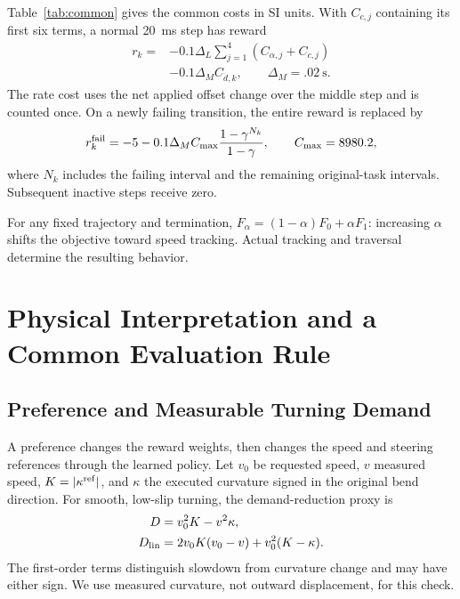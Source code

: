 \documentclass[journal]{IEEEtran}
\begin{document}
Table~\ref{tab:common} gives the common costs in SI units. With $C_{c,j}$ containing its first six terms, a normal 20~ms step has reward
\begin{equation}
\begin{split}
 r_k={}&-0.1\Delta_L\sum_{j=1}^4(C_{\alpha,j}+C_{c,j})\\
     &-0.1\Delta_M C_{\dot d,k},\qquad\Delta_M=.02~\mathrm s.
\end{split}
 \label{eq:reward}
\end{equation}
The rate cost uses the net applied offset change over the middle step and is counted once. On a newly failing transition, the entire reward is replaced by
\begin{equation}
 r_k^{\rm fail}=-5-0.1\Delta_M C_{\max}
 \frac{1-\gamma^{N_k}}{1-\gamma},\qquad C_{\max}=8980.2,
 \label{eq:terminal}
\end{equation}
where $N_k$ includes the failing interval and the remaining original-task intervals. Subsequent inactive steps receive zero.

For any fixed trajectory and termination, $F_\alpha=(1-\alpha)F_0+\alpha F_1$: increasing $\alpha$ shifts the objective toward speed tracking. Actual tracking and traversal determine the resulting behavior.

\section{Physical Interpretation and a Common Evaluation Rule}
\subsection{Preference and Measurable Turning Demand}
A preference changes the reward weights, then changes the speed and steering references through the learned policy. Let $v_0$ be requested speed, $v$ measured speed, $K=|\kappa^{\rm ref}|$, and $\kappa$ the executed curvature signed in the original bend direction. For smooth, low-slip turning, the demand-reduction proxy is
\begin{equation}
\begin{split}
 D&=v_0^2K-v^2\kappa,\\
 D_{\rm lin}&=2v_0K(v_0-v)+v_0^2(K-\kappa).
\end{split}
 \label{eq:allocation}
\end{equation}
The first-order terms distinguish slowdown from curvature change and may have either sign. We use measured curvature, not outward displacement, for this check.
\end{document}
